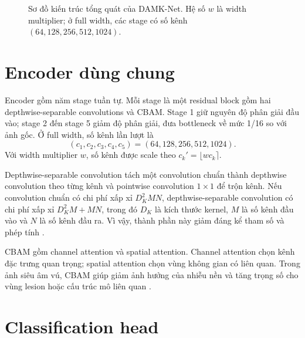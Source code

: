 \documentclass[12pt,a4paper,oneside]{report}
\newcommand{\modelname}{DAMK-Net}
\begin{document}
\begin{figure}[H]
{}
\caption{Sơ đồ kiến trúc tổng quát của \modelname{}. Hệ số $w$ là width multiplier; ở full width, các stage có số kênh $(64,128,256,512,1024)$.}
\label{fig:damk-overview}
\end{figure}

\section{Encoder dùng chung}

Encoder gồm năm stage tuần tự. Mỗi stage là một residual block gồm hai depthwise-separable convolutions và CBAM. Stage 1 giữ nguyên độ phân giải đầu vào; stage 2 đến stage 5 giảm độ phân giải, đưa bottleneck về mức 1/16 so với ảnh gốc. Ở full width, số kênh lần lượt là \citep{mednet,damknet}
\[
(c_1,c_2,c_3,c_4,c_5)=(64,128,256,512,1024).
\]
Với width multiplier $w$, số kênh được scale theo $c_k' = \lfloor w c_k \rceil$.

Depthwise-separable convolution tách một convolution chuẩn thành depthwise convolution theo từng kênh và pointwise convolution $1\times1$ để trộn kênh. Nếu convolution chuẩn có chi phí xấp xỉ $D_K^2MN$, depthwise-separable convolution có chi phí xấp xỉ $D_K^2M + MN$, trong đó $D_K$ là kích thước kernel, $M$ là số kênh đầu vào và $N$ là số kênh đầu ra. Vì vậy, thành phần này giảm đáng kể tham số và phép tính \citep{xception,mobilenet,mobilenetv2}.

CBAM gồm channel attention và spatial attention. Channel attention chọn kênh đặc trưng quan trọng; spatial attention chọn vùng không gian có liên quan. Trong ảnh siêu âm vú, CBAM giúp giảm ảnh hưởng của nhiễu nền và tăng trọng số cho vùng lesion hoặc cấu trúc mô liên quan \citep{cbam,mednet}.

\section{Classification head}
\end{document}
